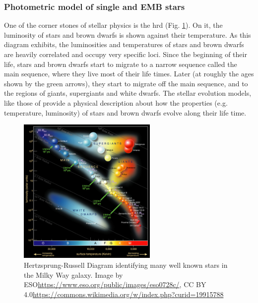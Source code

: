 \subsubsection{Photometric model of single and EMB stars}
\label{sect:cluster_ph}

One of the corner stones of stellar physics is the \gls{hrd} (Fig. \ref{fig:HR}). On it, the luminosity of stars and brown dwarfs is shown against their temperature. As this diagram exhibits, the luminosities and temperatures of stars and brown dwarfs are heavily correlated and occupy very specific loci. Since the beginning of their life, stars and brown dwarfs start to migrate to a narrow sequence called the main sequence, where they live most of their life times. Later (at roughly the ages shown by the green arrows), they start to migrate off the main sequence, and to the regions of giants, supergiants and white dwarfs. The stellar evolution models, like those of \citet{1998A&A...337..403B,2013MmSAI..84.1053A,2014IAUS..299..271A} provide a physical description about how the properties (e.g. temperature, luminosity) of stars and brown dwarfs evolve along their life time.

\begin{figure}[htp!]
\begin{center}
\includegraphics[page=1,width=0.6\textwidth]{background/Figures/Hertzsprung-Russel_StarData.png}
\caption{
Hertzsprung-Russell Diagram identifying many well known stars in the Milky Way galaxy. Image by ESO\url{https://www.eso.org/public/images/eso0728c/}, CC BY 4.0\url{https://commons.wikimedia.org/w/index.php?curid=19915788}
}
\label{fig:HR}
\end{center}
\end{figure}

